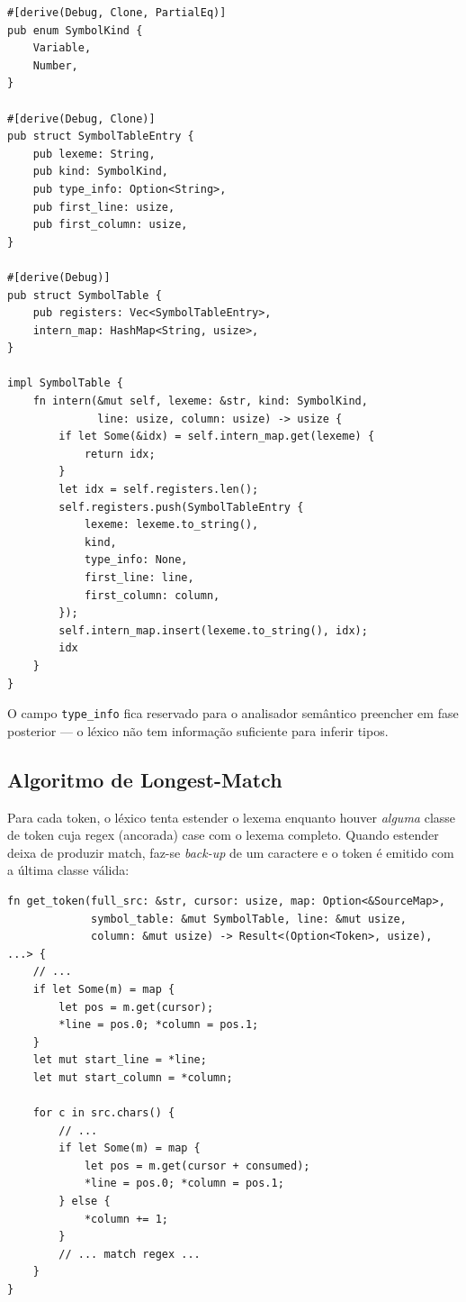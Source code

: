 \documentclass[12pt,a4paper]{article}
\begin{document}
\begin{lstlisting}[caption={\texttt{SymbolTable}, \texttt{SymbolTableEntry} e \texttt{intern()}}]
#[derive(Debug, Clone, PartialEq)]
pub enum SymbolKind {
    Variable,
    Number,
}

#[derive(Debug, Clone)]
pub struct SymbolTableEntry {
    pub lexeme: String,
    pub kind: SymbolKind,
    pub type_info: Option<String>,
    pub first_line: usize,
    pub first_column: usize,
}

#[derive(Debug)]
pub struct SymbolTable {
    pub registers: Vec<SymbolTableEntry>,
    intern_map: HashMap<String, usize>,
}

impl SymbolTable {
    fn intern(&mut self, lexeme: &str, kind: SymbolKind,
              line: usize, column: usize) -> usize {
        if let Some(&idx) = self.intern_map.get(lexeme) {
            return idx;
        }
        let idx = self.registers.len();
        self.registers.push(SymbolTableEntry {
            lexeme: lexeme.to_string(),
            kind,
            type_info: None,
            first_line: line,
            first_column: column,
        });
        self.intern_map.insert(lexeme.to_string(), idx);
        idx
    }
}
\end{lstlisting}

O campo \texttt{type\_info} fica reservado para o analisador semântico
preencher em fase posterior --- o léxico não tem informação suficiente
para inferir tipos.

\subsection{Algoritmo de Longest-Match}

Para cada token, o léxico tenta estender o lexema enquanto houver
\emph{alguma} classe de token cuja regex (ancorada) case com o lexema
completo. Quando estender deixa de produzir match, faz-se \emph{back-up}
de um caractere e o token é emitido com a última classe válida:

\begin{lstlisting}[caption={Núcleo de \texttt{get\_token} com \texttt{SourceMap}}]
fn get_token(full_src: &str, cursor: usize, map: Option<&SourceMap>,
             symbol_table: &mut SymbolTable, line: &mut usize,
             column: &mut usize) -> Result<(Option<Token>, usize), ...> {
    // ...
    if let Some(m) = map {
        let pos = m.get(cursor);
        *line = pos.0; *column = pos.1;
    }
    let mut start_line = *line;
    let mut start_column = *column;

    for c in src.chars() {
        // ...
        if let Some(m) = map {
            let pos = m.get(cursor + consumed);
            *line = pos.0; *column = pos.1;
        } else {
            *column += 1;
        }
        // ... match regex ...
    }
}
\end{lstlisting}
\end{document}
